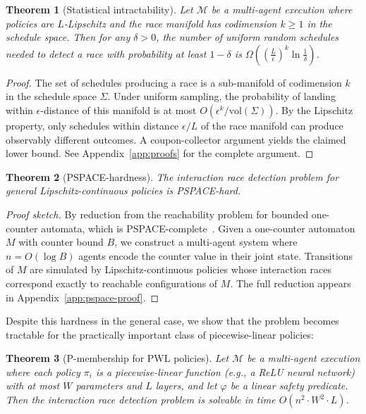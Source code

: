 \documentclass[11pt]{article}
\newtheorem{theorem}{Theorem}[section]
\newcommand{\calM}{\mathcal{M}}
\begin{document}
\begin{theorem}[Statistical intractability]
\label{thm:stat-intract}
Let $\calM$ be a multi-agent execution where policies are $L$-Lipschitz
and the race manifold has codimension $k \geq 1$ in the schedule space.
Then for any $\delta > 0$, the number of uniform random schedules needed
to detect a race with probability at least $1 - \delta$ is
$\Omega\!\left(\left(\frac{L}{\epsilon}\right)^{k} \ln \frac{1}{\delta}\right)$.
\end{theorem}

\begin{proof}
The set of schedules producing a race is a sub-manifold of codimension $k$
in the schedule space $\Sigma$. Under uniform sampling, the probability
of landing within $\epsilon$-distance of this manifold is at most
$O(\epsilon^k / \mathrm{vol}(\Sigma))$. By the Lipschitz property, only
schedules within distance $\epsilon/L$ of the race manifold can produce
observably different outcomes. A coupon-collector argument yields the
claimed lower bound. See Appendix~\ref{app:proofs} for the complete argument.
\end{proof}

\begin{theorem}[PSPACE-hardness]
\label{thm:pspace-hard}
The interaction race detection problem for general Lipschitz-continuous
policies is PSPACE-hard.
\end{theorem}

\begin{proof}[Proof sketch]
By reduction from the reachability problem for bounded one-counter automata,
which is PSPACE-complete~\cite{fearnley2015reachability}. Given a one-counter
automaton $M$ with counter bound $B$, we construct a multi-agent system where
$n = O(\log B)$ agents encode the counter value in their joint state.
Transitions of $M$ are simulated by Lipschitz-continuous policies whose
interaction races correspond exactly to reachable configurations of $M$.
The full reduction appears in Appendix~\ref{app:pspace-proof}.
\end{proof}

Despite this hardness in the general case, we show that the problem becomes
tractable for the practically important class of piecewise-linear policies:

\begin{theorem}[P-membership for PWL policies]
\label{thm:pwl-p}
Let $\calM$ be a multi-agent execution where each policy $\pi_i$ is a
piecewise-linear function (e.g., a ReLU neural network) with at most $W$
parameters and $L$ layers, and let $\varphi$ be a linear safety predicate.
Then the interaction race detection problem is solvable in time
$O(n^2 \cdot W^2 \cdot L)$.
\end{theorem}
\end{document}
